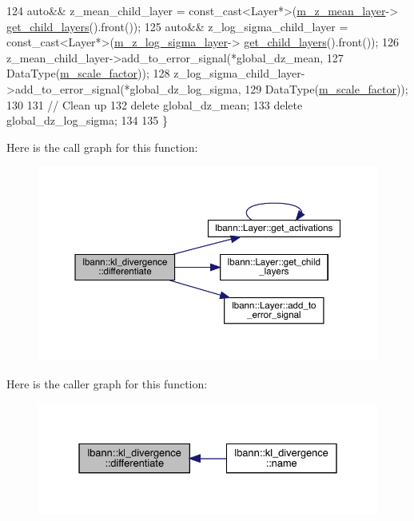 \begin{DoxyCode}
124   \textcolor{keyword}{auto}&& z\_mean\_child\_layer = \textcolor{keyword}{const\_cast<}Layer*\textcolor{keyword}{>}(\hyperlink{classlbann_1_1kl__divergence_a7665b4f12f4e842d1850102295c21e3e}{m\_z\_mean\_layer}->
      \hyperlink{classlbann_1_1Layer_aa0058c8ec4913efc3e4de5d6f61eb8db}{get\_child\_layers}().front());
125   \textcolor{keyword}{auto}&& z\_log\_sigma\_child\_layer = \textcolor{keyword}{const\_cast<}Layer*\textcolor{keyword}{>}(\hyperlink{classlbann_1_1kl__divergence_aae1f6deb97728e09771840f447a571b1}{m\_z\_log\_sigma\_layer}->
      \hyperlink{classlbann_1_1Layer_aa0058c8ec4913efc3e4de5d6f61eb8db}{get\_child\_layers}().front());
126   z\_mean\_child\_layer->add\_to\_error\_signal(*global\_dz\_mean,
127                                           DataType(\hyperlink{classlbann_1_1objective__function__term_a59a544b8ff0455ed5091de3bf0d81c3c}{m\_scale\_factor}));
128   z\_log\_sigma\_child\_layer->add\_to\_error\_signal(*global\_dz\_log\_sigma,
129                                                DataType(\hyperlink{classlbann_1_1objective__function__term_a59a544b8ff0455ed5091de3bf0d81c3c}{m\_scale\_factor}));
130 
131   \textcolor{comment}{// Clean up}
132   \textcolor{keyword}{delete} global\_dz\_mean;
133   \textcolor{keyword}{delete} global\_dz\_log\_sigma;
134 
135 \}
\end{DoxyCode}
Here is the call graph for this function\+:\nopagebreak
\begin{figure}[H]
\begin{center}
\leavevmode
\includegraphics[width=350pt]{classlbann_1_1kl__divergence_aeb39d1ba1e74874cbf396fbe137ff601_cgraph}
\end{center}
\end{figure}
Here is the caller graph for this function\+:\nopagebreak
\begin{figure}[H]
\begin{center}
\leavevmode
\includegraphics[width=331pt]{classlbann_1_1kl__divergence_aeb39d1ba1e74874cbf396fbe137ff601_icgraph}
\end{center}
\end{figure}
